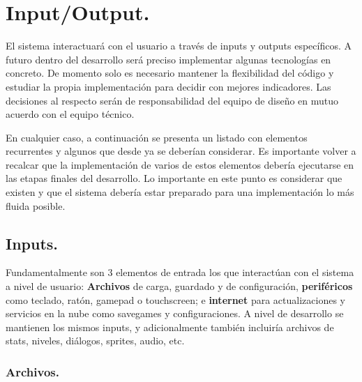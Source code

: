 
\section{Input/Output.}\label{io:input-output}


El sistema interactuará con el usuario a través de inputs y outputs específicos. A futuro dentro del desarrollo será preciso implementar algunas tecnologías en concreto. De momento solo es necesario mantener la flexibilidad del código y estudiar la propia implementación para decidir con mejores indicadores. Las decisiones al respecto serán de responsabilidad del equipo de diseño en mutuo acuerdo con el equipo técnico.

En cualquier caso, a continuación se presenta un listado con elementos recurrentes y algunos que desde ya se deberían considerar. Es importante volver a recalcar que la implementación de varios de estos elementos debería ejecutarse en las etapas finales del desarrollo. Lo importante en este punto es considerar que existen y que el sistema debería estar preparado para una implementación lo más fluida posible.

\subsection{Inputs.}
Fundamentalmente son 3 elementos de entrada los que interactúan con el sistema a nivel de usuario: \textbf{Archivos} de carga, guardado y de configuración, \textbf{periféricos} como teclado, ratón, gamepad o touchscreen; e \textbf{internet} para actualizaciones y servicios en la nube como savegames y configuraciones. A nivel de desarrollo se mantienen los mismos inputs, y adicionalmente también incluiría archivos de stats, niveles, diálogos, sprites, audio, etc.

\subsubsection{Archivos.}

